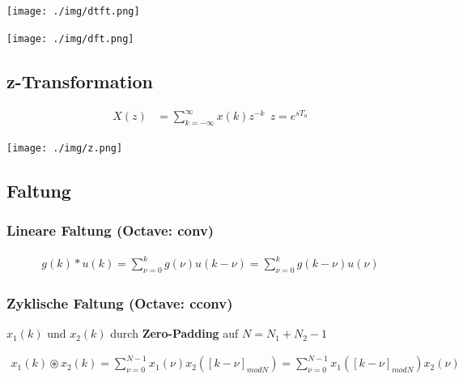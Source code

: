 \documentclass[10pt,a4paper]{article}
\begin{document}
\normalsize
  \begin{center}
      \texttt{[image: ./img/dtft.png]}
  \end{center}
  \begin{center}
      \texttt{[image: ./img/dft.png]}
  \end{center}
  \subsection{z-Transformation}
  \begin{mdframed}[style=exercise]
    \begin{align}
        X(z) &=\sum_{k=-\infty}^{\infty} x(k)z^{-k} \ \ z=e^{s T_a}
    \end{align}
  \end{mdframed}
  \begin{center}
      \texttt{[image: ./img/z.png]}
  \end{center}
  \subsection{Faltung}
  \subsubsection{Lineare Faltung (\textbf{Octave:} conv)}
  \begin{mdframed}[style=exercise]
    \begin{align}
        g(k)*u(k) = \sum_{\nu =0}^{k} g(\nu) u(k-\nu)= \sum_{\nu =0}^{k} g(k-\nu) u(\nu)
    \end{align}
  \end{mdframed}
  \subsubsection{Zyklische Faltung (\textbf{Octave:} cconv)}
  $x_1(k)$ und $x_2(k)$ durch \textbf{Zero-Padding} auf $N = N_1 +N_2 -1$ 
\scriptsize
  \begin{mdframed}[style=exercise]
    \begin{align}
        x_1(k) \circledast x_2(k) = \sum_{\nu =0}^{N-1} x_1(\nu) x_2([k-\nu]_{modN})= \sum_{\nu =0}^{N-1}x_1([k-\nu]_{modN}) x_2(\nu)
    \end{align}
  \end{mdframed} 
\end{document}

